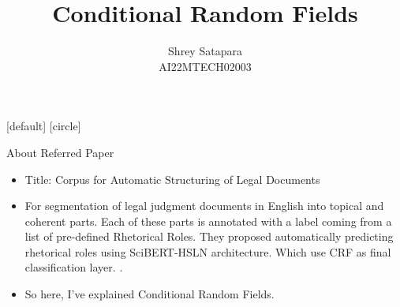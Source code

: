 \documentclass[10pt]{beamer}
\title[Conditional Random Fields]{Conditional Random Fields}
\theoremstyle{remark}
\theoremstyle{definition}
\begin{document}
\author[Shrey Satapara]{
	\begin{tabular}{c} 
	\Large
	Shrey Satapara\\
    \footnotesize AI22MTECH02003 \\
\end{tabular}
\vspace{-4ex}}



\begin{noheadline}
\begin{frame} \maketitle \end{frame}
\end{noheadline}

[default]
[circle]

\begin{frame}{About Referred Paper}
\begin{itemize}
    \item Title: Corpus for Automatic Structuring of Legal Documents \cite{2201.13125}
    \item For segmentation of legal judgment documents in English  into topical and coherent parts. Each of these parts is annotated with a label coming from a list of pre-defined Rhetorical Roles. They proposed automatically predicting rhetorical roles using SciBERT-HSLN architecture. Which use CRF as final classification layer. \cite{2102.06008}.
    \item So here, I've explained Conditional Random Fields.
\end{itemize}
    
\end{frame}
\end{document}
